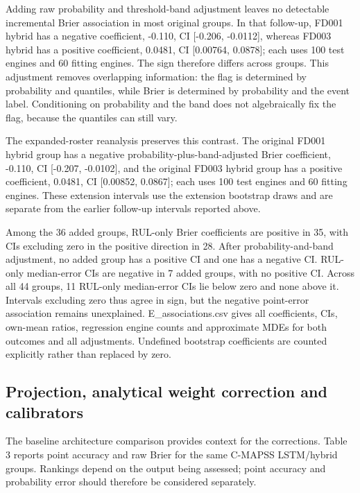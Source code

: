 \documentclass[IJPHM, 2026, 0]{phmsociety}
\begin{document}
Adding raw probability and threshold-band adjustment leaves no detectable incremental Brier association in most original groups. In that follow-up, FD001 hybrid has a negative coefficient, \mbox{-0.110}, CI {[}\mbox{-0.206}, \mbox{-0.0112}{]}, whereas FD003 hybrid has a positive coefficient, \mbox{0.0481}, CI {[}\mbox{0.00764}, \mbox{0.0878}{]}; each uses \mbox{100} test engines and \mbox{60} fitting engines. The sign therefore differs across groups. This adjustment removes overlapping information: the flag is determined by probability and quantiles, while Brier is determined by probability and the event label. Conditioning on probability and the band does not algebraically fix the flag, because the quantiles can still vary.

The expanded-roster reanalysis preserves this contrast. The original FD001 hybrid group has a negative probability-plus-band-adjusted Brier coefficient, \mbox{-0.110}, CI {[}\mbox{-0.207}, \mbox{-0.0102}{]}, and the original FD003 hybrid group has a positive coefficient, \mbox{0.0481}, CI {[}\mbox{0.00852}, \mbox{0.0867}{]}; each uses \mbox{100} test engines and \mbox{60} fitting engines. These extension intervals use the extension bootstrap draws and are separate from the earlier follow-up intervals reported above.

Among the \mbox{36} added groups, RUL-only Brier coefficients are positive in \mbox{35}, with CIs excluding zero in the positive direction in 28. After probability-and-band adjustment, no added group has a positive CI and one has a negative CI. RUL-only median-error CIs are negative in \mbox{7} added groups, with no positive CI. Across all \mbox{44} groups, \mbox{11} RUL-only median-error CIs lie below zero and none above it. Intervals excluding zero thus agree in sign, but the negative point-error association remains unexplained. E\_\allowbreak{}associations.csv gives all coefficients, CIs, own-mean ratios, regression engine counts and approximate MDEs for both outcomes and all adjustments. Undefined bootstrap coefficients are counted explicitly rather than replaced by zero.

\subsection{Projection, analytical weight correction and calibrators}\label{projection-analytical-weight-correction-and-calibrators}

The baseline architecture comparison provides context for the corrections. Table \mbox{3} reports point accuracy and raw Brier for the same C-MAPSS LSTM/hybrid groups. Rankings depend on the output being assessed; point accuracy and probability error should therefore be considered separately.
\end{document}
